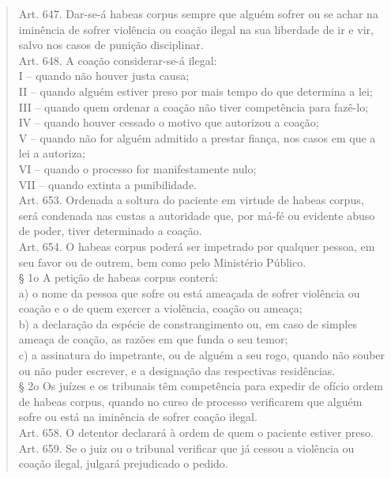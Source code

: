 \documentclass{article}
\begin{document}
\begin{quote}
    Art. 647. Dar-se-á habeas corpus sempre que alguém sofrer ou se achar na iminência de sofrer violência ou coação ilegal na sua liberdade de ir e vir, salvo nos casos de punição disciplinar.\\
    Art. 648. A coação considerar-se-á ilegal:\\
    I – quando não houver justa causa;\\
    II – quando alguém estiver preso por mais tempo do que determina a lei;\\
    III – quando quem ordenar a coação não tiver competência para fazê-lo;\\
    IV – quando houver cessado o motivo que autorizou a coação;\\
    V – quando não for alguém admitido a prestar fiança, nos casos em que a lei a autoriza;\\
    VI – quando o processo for manifestamente nulo;\\
    VII – quando extinta a punibilidade.\\
    Art. 653. Ordenada a soltura do paciente em virtude de habeas corpus, será condenada nas custas a autoridade que, por má-fé ou evidente abuso de poder, tiver determinado a coação.\\
    Art. 654. O habeas corpus poderá ser impetrado por qualquer pessoa, em seu favor ou de outrem, bem como pelo Ministério Público.\\
    § 1o A petição de habeas corpus conterá:\\
    a) o nome da pessoa que sofre ou está ameaçada de sofrer violência ou coação e o de quem exercer a violência, coação ou ameaça;\\
    b) a declaração da espécie de constrangimento ou, em caso de simples ameaça de coação, as razões em que funda o seu temor;\\
    c) a assinatura do impetrante, ou de alguém a seu rogo, quando não souber ou não puder escrever, e a designação das respectivas residências.\\
    § 2o Os juízes e os tribunais têm competência para expedir de ofício ordem de habeas corpus, quando no curso de processo verificarem que alguém sofre ou está na iminência de sofrer coação ilegal.\\
    Art. 658. O detentor declarará à ordem de quem o paciente estiver preso.\\
    Art. 659. Se o juiz ou o tribunal verificar que já cessou a violência ou coação ilegal, julgará prejudicado o pedido.\\

\end{quote}
\end{document}
